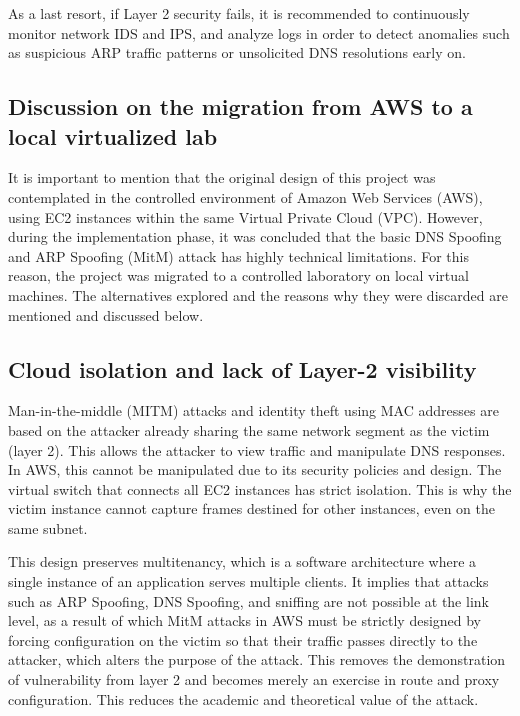 \documentclass[conference]{IEEEtran}
\begin{document}
As a last resort, if Layer 2 security fails, it is recommended to continuously monitor network IDS and IPS, and analyze logs in order to detect anomalies such as suspicious ARP traffic patterns or unsolicited DNS resolutions early on.


\subsection{Discussion on the migration from AWS to a local virtualized lab}
It is important to mention that the original design of this project was contemplated in the controlled environment of Amazon Web Services (AWS), using EC2 instances within the same Virtual Private Cloud (VPC). However, during the implementation phase, it was concluded that the basic DNS Spoofing and ARP Spoofing (MitM) attack has highly technical limitations. For this reason, the project was migrated to a controlled laboratory on local virtual machines. The alternatives explored and the reasons why they were discarded are mentioned and discussed below.


\subsection{Cloud isolation and lack of Layer-2 visibility}

Man-in-the-middle (MITM) attacks and identity theft using MAC addresses are based on the attacker already sharing the same network segment as the victim (layer 2). This allows the attacker to view traffic and manipulate DNS responses. In AWS, this cannot be manipulated due to its security policies and design. The virtual switch that connects all EC2 instances has strict isolation. This is why the victim instance cannot capture frames destined for other instances, even on the same subnet.

This design preserves multitenancy, which is a software architecture where a single instance of an application serves multiple clients. It implies that attacks such as ARP Spoofing, DNS Spoofing, and sniffing are not possible at the link level, as a result of which MitM attacks in AWS must be strictly designed by forcing configuration on the victim so that their traffic passes directly to the attacker, which alters the purpose of the attack. This removes the demonstration of vulnerability from layer 2 and becomes merely an exercise in route and proxy configuration. This reduces the academic and theoretical value of the attack.
\end{document}
